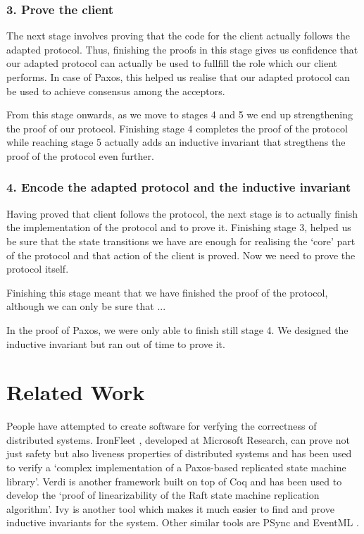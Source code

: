 \subsubsection{3. Prove the client}
The next stage involves proving that the code for the client actually follows
the adapted protocol. Thus, finishing the proofs in this stage gives us
confidence that our adapted protocol can actually be used to fullfill the role
which our client performs. In case of Paxos, this helped us realise that our
adapted protocol can be used to achieve consensus among the acceptors.

From this stage onwards, as we move to stages 4 and 5 we end up strengthening
the proof of our protocol. Finishing stage 4 completes the proof of the protocol
while reaching stage 5 actually adds an inductive invariant that stregthens the
proof of the protocol even further.

\subsubsection{4. Encode the adapted protocol and the inductive invariant}
Having proved that client follows the protocol, the next stage is
to actually finish the implementation of the protocol and to prove it. Finishing
stage 3, helped us be sure that the state transitions we have are enough for
realising the `core' part of the protocol and that action of the client is proved.
Now we need to prove the protocol itself.

Finishing this stage meant that we have finished the proof of the protocol,
although we can only be sure that ...

In the proof of Paxos, we were only able to finish still stage 4. We designed
the inductive invariant but ran out of time to prove it.


\section{Related Work}
People have attempted to create software for verfying the correctness of distributed
systems. IronFleet \cite{15}, developed at Microsoft Research, can prove not just
safety but also liveness properties of distributed systems and has been used
to verify a `complex implementation of a Paxos-based replicated state machine
library'. Verdi \cite{16} is another framework built on top of Coq and has been used
to develop the `proof of linearizability of the Raft state machine replication
algorithm'. Ivy \cite{19} is another tool which makes it much easier to find and
prove inductive invariants for the system. Other similar tools are PSync \cite{17}
and EventML \cite{18}.

